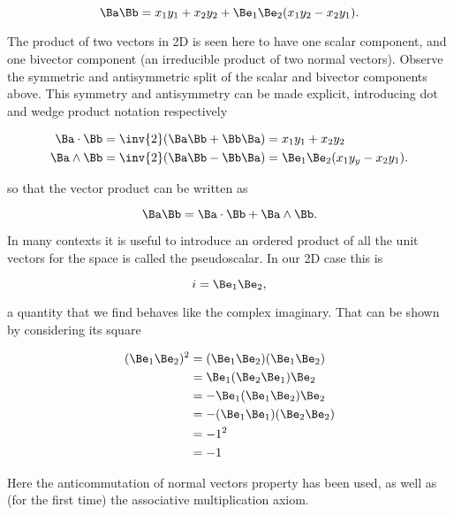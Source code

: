 \begin{equation}\label{eqn:gaQuickIntro:30b}
\Ba \Bb = x_1 y_1 + x_2 y_2 + \Be_1 \Be_2 (x_1 y_2 - x_2 y_1).
\end{equation}

The product of two vectors in 2D is seen here to have one scalar component, and one bivector component (an irreducible product of two normal vectors).  Observe the symmetric and antisymmetric split of the scalar and bivector components above.  This symmetry and antisymmetry can be made explicit, introducing dot and wedge product notation respectively

\begin{align}\label{eqn:gaQuickIntro:90}
\Ba \cdot \Bb &= \inv{2}( \Ba \Bb + \Bb \Ba) = x_1 y_1 + x_2 y_2 \\
\Ba \wedge \Bb &= \inv{2}( \Ba \Bb - \Bb \Ba) = \Be_1 \Be_2 (x_1 y_y - x_2 y_1).
\end{align}

so that the vector product can be written as

\begin{equation}\label{eqn:gaQuickIntro:110}
\Ba \Bb = \Ba \cdot \Bb + \Ba \wedge \Bb.
\end{equation}

In many contexts it is useful to introduce an ordered product of all the unit vectors for the space is called the pseudoscalar.  In our 2D case this is

\begin{equation}\label{eqn:gaQuickIntro:130}
i = \Be_1 \Be_2,
\end{equation}

a quantity that we find behaves like the complex imaginary.  That can be shown by considering its square

\begin{align*}
(\Be_1 \Be_2)^2
&=
(\Be_1 \Be_2)
(\Be_1 \Be_2) \\
&=
\Be_1 (\Be_2 \Be_1) \Be_2 \\
&=
-\Be_1 (\Be_1 \Be_2) \Be_2 \\
&=
-(\Be_1 \Be_1) (\Be_2 \Be_2) \\
&=
-1^2 \\
&= -1
\end{align*}

Here the anticommutation of normal vectors property has been used, as well as (for the first time) the associative multiplication axiom.

\EndArticle
